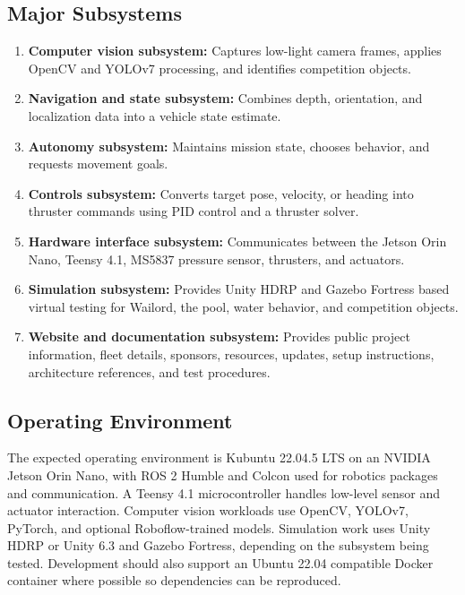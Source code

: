 \documentclass[12pt]{article}
\begin{document}
\subsection{Major Subsystems}
\begin{enumerate}[leftmargin=*]
  \item \textbf{Computer vision subsystem:} Captures low-light camera frames, applies OpenCV and YOLOv7 processing, and identifies competition objects.
  \item \textbf{Navigation and state subsystem:} Combines depth, orientation, and localization data into a vehicle state estimate.
  \item \textbf{Autonomy subsystem:} Maintains mission state, chooses behavior, and requests movement goals.
  \item \textbf{Controls subsystem:} Converts target pose, velocity, or heading into thruster commands using PID control and a thruster solver.
  \item \textbf{Hardware interface subsystem:} Communicates between the Jetson Orin Nano, Teensy 4.1, MS5837 pressure sensor, thrusters, and actuators.
  \item \textbf{Simulation subsystem:} Provides Unity HDRP and Gazebo Fortress based virtual testing for Wailord, the pool, water behavior, and competition objects.
  \item \textbf{Website and documentation subsystem:} Provides public project information, fleet details, sponsors, resources, updates, setup instructions, architecture references, and test procedures.
\end{enumerate}

\subsection{Operating Environment}
The expected operating environment is Kubuntu 22.04.5 LTS on an NVIDIA Jetson Orin Nano, with ROS 2 Humble and Colcon used for robotics packages and communication. A Teensy 4.1 microcontroller handles low-level sensor and actuator interaction. Computer vision workloads use OpenCV, YOLOv7, PyTorch, and optional Roboflow-trained models. Simulation work uses Unity HDRP or Unity 6.3 and Gazebo Fortress, depending on the subsystem being tested. Development should also support an Ubuntu 22.04 compatible Docker container where possible so dependencies can be reproduced.
\end{document}
